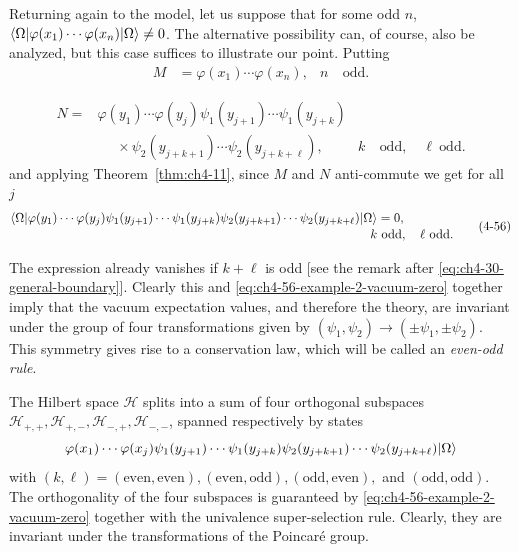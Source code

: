 Returning again to the model, let us suppose that for some odd $n$,
$\langle \Omega\rvert\varphi(x_1)\cdots\varphi(x_n)\lvert \Omega\rangle\ne0$.  The
alternative possibility can, of course, also be analyzed, but this case
suffices to illustrate our point.  Putting
\begin{equation*}
\begin{aligned}
  M&=\varphi(x_1)\cdots\varphi(x_n), & n&\ \text{odd}.
\end{aligned}
\end{equation*}

\begin{equation*}
\begin{aligned}
  N={}&\varphi(y_1)\cdots\varphi(y_j)
  \psi_1(y_{j+1})\cdots\psi_1(y_{j+k})\\
  &\phantom{={}}\times\psi_2(y_{j+k+1})\cdots\psi_2(y_{j+k+\ell}),
  & k&\ \text{odd},\quad \ell\ \text{odd}.
\end{aligned}
\end{equation*}
and applying Theorem~\ref{thm:ch4-11}, since $M$ and $N$ anti-commute we get for all $j$
\begin{equation}
\begin{aligned}
  \langle \Omega\rvert\varphi(y_1)\cdots\varphi(y_j)
  \psi_1(y_{j+1})\cdots\psi_1(y_{j+k})
  \psi_2(y_{j+k+1})\cdots\psi_2(y_{j+k+\ell})\lvert \Omega\rangle
  &=0,\\[-2pt]
  k&\ \text{odd},\quad \ell\ \text{odd}.
\end{aligned}
  \tag{4-56}\label{eq:ch4-56-example-2-vacuum-zero}
\end{equation}

The expression already vanishes if $k+\ell$ is odd [see the remark after
\eqref{eq:ch4-30-general-boundary}].  Clearly this and \eqref{eq:ch4-56-example-2-vacuum-zero} together imply that the vacuum expectation
values, and therefore the theory, are invariant under the group of four
transformations given by $(\psi_1,\psi_2)\to(\pm\psi_1,\pm\psi_2)$.  This
symmetry gives rise to a conservation law, which will be called an
\emph{even-odd rule}.

The Hilbert space $\mathcal H$ splits into a sum of four orthogonal subspaces
$\mathcal H_{+,+},\mathcal H_{+,-},\mathcal H_{-,+},\mathcal H_{-,-}$, spanned
respectively by states
\begin{equation*}
  \varphi(x_1)\cdots\varphi(x_j)\psi_1(y_{j+1})\cdots\psi_1(y_{j+k})
  \psi_2(y_{j+k+1})\cdots\psi_2(y_{j+k+\ell})\lvert \Omega\rangle
\end{equation*}
with $(k,\ell)=(\text{even},\text{even}), (\text{even},\text{odd}),
(\text{odd},\text{even}),$ and $(\text{odd},\text{odd})$.  The orthogonality
of the four subspaces is guaranteed by \eqref{eq:ch4-56-example-2-vacuum-zero} together with the univalence
super-selection rule.  Clearly, they are invariant under the transformations
of the Poincaré group.

